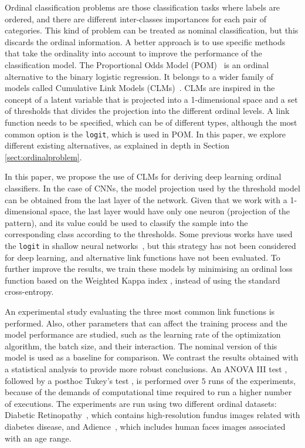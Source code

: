 \documentclass[journal]{IEEEtran}
\begin{document}
	Ordinal classification problems are those classification tasks where labels are ordered, and there are different inter-classes importances for each pair of categories. This kind of problem can be treated as nominal classification, but this discards the ordinal information. A better approach is to use specific methods that take the ordinality into account to improve the performance of the classification model. The Proportional Odds Model (POM)~\cite{mccullagh1980regression} is an ordinal alternative to the binary logistic regression. It belongs to a wider family of models called Cumulative Link Models (CLMs)~\cite{agresti2010analysis}. CLMs are inspired in the concept of a latent variable that is projected into a 1-dimensional space and a set of thresholds that divides the projection into the different ordinal levels. A link function needs to be specified, which can be of different types, although the most common option is the \texttt{logit}, which is used in POM. In this paper, we explore different existing alternatives, as explained in depth in Section \ref{sect:ordinalproblem}.
	
	In this paper, we propose the use of CLMs for deriving deep learning ordinal classifiers. In the case of CNNs, the model projection used by the threshold model can be obtained from the last layer of the network. Given that we work with a 1-dimensional space, the last layer would have only one neuron (projection of the pattern), and its value could be used to classify the sample into the corresponding class according to the thresholds. Some previous works have used the \texttt{logit} in shallow neural networks~\cite{gutierrez2016ordinal}, but this strategy has not been considered for deep learning, and alternative link functions have not been evaluated. To further improve the results, we train these models by minimising an ordinal loss function based on the Weighted Kappa index \cite{de2018weighted}, instead of using the standard cross-entropy.
	
	An experimental study evaluating the three most common link functions is performed. Also, other parameters that can affect the training process and the model performance are studied, such as the learning rate of the optimization algorithm, the batch size, and their interaction. The nominal version of this model is used as a baseline for comparison. We contrast the results obtained with a statistical analysis to provide more robust conclusions. An ANOVA III test \cite{miller1997beyond}, followed by a posthoc Tukey's test \cite{tukey1949comparing}, is performed over $5$ runs of the experiments, because of the demands of computational time required to run a higher number of executions. The experiments are run using two different ordinal datasets: Diabetic Retinopathy~\cite{de2018weighted}, which contains high-resolution fundus images related with diabetes disease, and Adience~\cite{beckham2017unimodal}, which includes human faces images associated with an age range.
	
\end{document}
